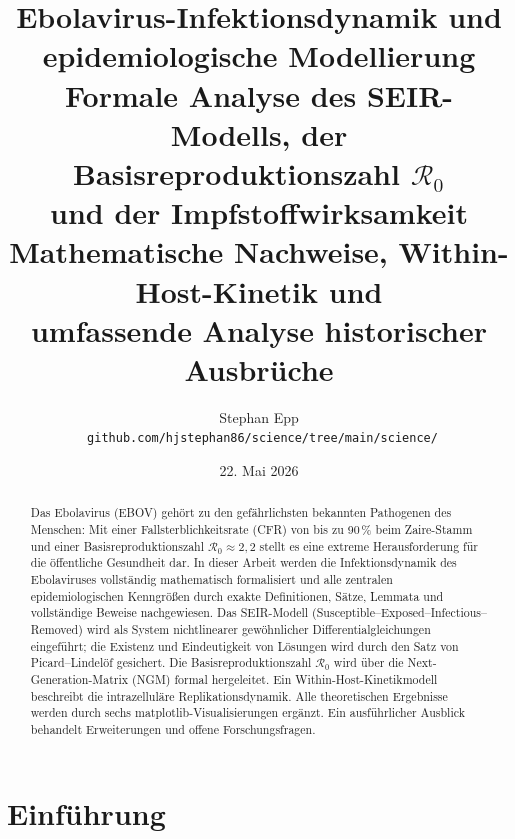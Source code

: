 ﻿\documentclass[12pt,a4paper]{article}
\theoremstyle{definition}
\theoremstyle{plain}
\theoremstyle{remark}
\begin{document}
\title{\textbf{Ebolavirus-Infektionsdynamik und epidemiologische Modellierung}\\[6pt]
\large Formale Analyse des SEIR-Modells, der Basisreproduktionszahl $\mathcal{R}_0$\\
und der Impfstoffwirksamkeit\\[8pt]
\normalsize Mathematische Nachweise, Within-Host-Kinetik und\\
umfassende Analyse historischer Ausbrüche}
\author{Stephan Epp\\[4pt]
\
\small \texttt{github.com/hjstephan86/science/tree/main/science/}}
\date{22. Mai 2026}
\maketitle

\begin{abstract}
Das Ebolavirus (EBOV) gehört zu den gefährlichsten bekannten Pathogenen des Menschen:
Mit einer Fallsterblichkeitsrate (CFR) von bis zu 90\,\% beim Zaire-Stamm und
einer Basisreproduktionszahl $\mathcal{R}_0 \approx 2{,}2$ stellt es eine extreme
Herausforderung für die öffentliche Gesundheit dar. In dieser Arbeit werden die
Infektionsdynamik des Ebolaviruses vollständig mathematisch formalisiert und alle
zentralen epidemiologischen Kenngrößen durch exakte Definitionen, Sätze, Lemmata
und vollständige Beweise nachgewiesen. Das SEIR-Modell (Susceptible--Exposed--Infectious--Removed)
wird als System nichtlinearer gewöhnlicher Differentialgleichungen eingeführt; die
Existenz und Eindeutigkeit von Lösungen wird durch den Satz von Picard--Lindelöf
gesichert. Die Basisreproduktionszahl $\mathcal{R}_0$ wird über die Next-Generation-Matrix
(NGM) formal hergeleitet. Ein Within-Host-Kinetikmodell beschreibt die intrazelluläre
Replikationsdynamik. Alle theoretischen Ergebnisse werden durch sechs matplotlib-Visualisierungen
ergänzt. Ein ausführlicher Ausblick behandelt Erweiterungen und offene Forschungsfragen.
\end{abstract}

\tableofcontents
\newpage

\section{Einführung}
\end{document}
